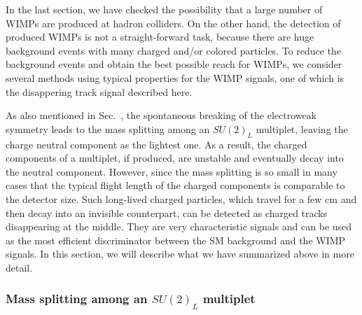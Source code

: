 \documentclass[12pt,twoside,book]{article}
\begin{document}
In the last section, we have checked the possibility that a large number of WIMPs are produced at hadron colliders.
On the other hand, the detection of produced WIMPs is not a straight-forward task, because there are huge background events with many charged and/or colored particles.
To reduce the background events and obtain the best possible reach for WIMPs, we consider several methods using typical properties for the WIMP signals, one of which is the disappering track signal described here.

As also mentioned in Sec.~, the spontaneous breaking of the electroweak symmetry leads to the mass splitting among an $SU(2)_L$ multiplet, leaving the charge neutral component as the lightest one.
As a result, the charged components of a multiplet, if produced, are unstable and eventually decay into the neutral component.
However, since the mass splitting is so small in many cases that the typical flight length of the charged components is comparable to the detector size.
Such long-lived charged particles, which travel for a few $\mathrm{cm}$ and then decay into an invisible counterpart, can be detected as charged tracks disappearing at the middle.
They are very characteristic signals and can be used as the most efficient discriminator between the SM background and the WIMP signals.
In this section, we will describe what we have summarized above in more detail.

\subsubsection*{Mass splitting among an $SU(2)_L$ multiplet}
\end{document}

